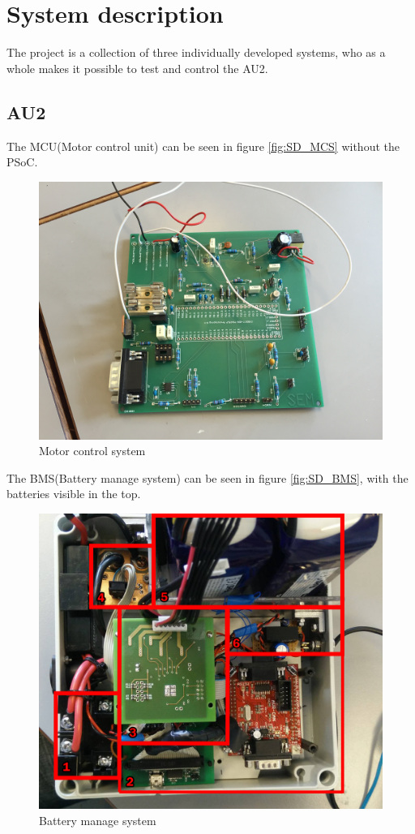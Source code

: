 \chapter{System description}
The project is a collection of three individually developed systems, who as a whole makes it possible to test and control the AU2.

\section{AU2}
The MCU(Motor control unit) can be seen in figure \vref{fig:SD_MCS} without the PSoC.

\begin{figure}[H]
	\centering
	\includegraphics[width=0.6\linewidth]{SubPages/Images/SD_MCS}
	\caption{Motor control system}
	\label{fig:SD_MCS}
\end{figure}

The BMS(Battery manage system) can be seen in figure \vref{fig:SD_BMS}, with the batteries visible in the top.

\begin{figure}[H]
	\centering
	\includegraphics[width=0.7\linewidth]{SubPages/Images/SD_BMS}
	\caption{Battery manage system}
	\label{fig:SD_BMS}
\end{figure}

